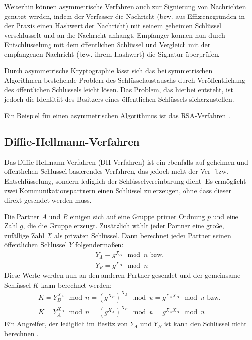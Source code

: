 Weiterhin können asymmetrische Verfahren auch zur Signierung von Nachrichten genutzt werden, indem der Verfasser die Nachricht (bzw. aus Effizienzgründen in der Praxis einen Hashwert der Nachricht) mit seinem geheimen Schlüssel verschlüsselt und an die Nachricht anhängt. Empfänger können nun durch Entschlüsselung mit dem öffentlichen Schlüssel und Vergleich mit der empfangenen Nachricht (bzw. ihrem Hashwert) die Signatur überprüfen.

Durch asymmetrische Kryptographie lässt sich das bei symmetrischen Algorithmen bestehende Problem des Schlüsselaustauschs durch Veröffentlichung des öffentlichen Schlüssels leicht lösen. Das Problem, das hierbei entsteht, ist jedoch die Identität des Besitzers eines öffentlichen Schlüssels sicherzustellen.

Ein Beispiel für einen asymmetrischen Algorithmus ist das RSA-Verfahren \cite{Schneier2006}.

\subsection{Diffie-Hellmann-Verfahren}

\label{sec_diffie_hellman}

Das Diffie-Hellmann-Verfahren (DH-Verfahren) ist ein ebenfalls auf geheimen und öffentlichen Schlüssel basierendes Verfahren, das jedoch nicht der Ver- bzw. Entschlüsselung, sondern lediglich der Schlüsselvereinbarung dient. Es ermöglicht zwei Kommunikationspartnern einen Schlüssel zu erzeugen, ohne dass dieser direkt gesendet werden muss. 

Die Partner \(A\) und \(B\) einigen sich auf eine Gruppe primer Ordnung \(p\) und eine Zahl \(g\), die die Gruppe erzeugt. Zusätzlich wählt jeder Partner eine große, zufällige Zahl \(X\) als privaten Schlüssel. Dann berechnet jeder Partner seinen öffentlichen Schlüssel \(Y\) folgendermaßen:
\begin{align*}
&Y_A = g^{X_A} \mod{n} \text{ bzw.}\\
&Y_B = g^{X_B} \mod{n}
\end{align*}
Diese Werte werden nun an den anderen Partner gesendet und der gemeinsame Schlüssel \(K\) kann berechnet werden:
\begin{align*}
&K = Y_B^{X_A} \mod{n} = (g^{X_B})^{X_A }\mod{n} = g^{X_A X_B}\mod{n} \text{ bzw.}\\
&K = Y_A^{X_B} \mod{n} = (g^{X_A})^{X_B }\mod{n} = g^{X_A X_B}\mod{n} 
\end{align*}
Ein Angreifer, der lediglich im Besitz von \(Y_A\) und \(Y_B\) ist kann den Schlüssel nicht berechnen \cite{Schneier2006}. 


